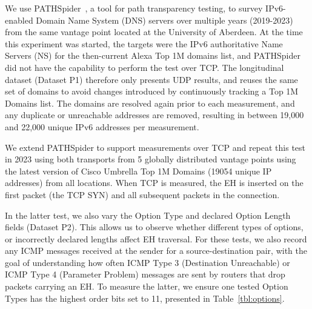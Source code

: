 \documentclass[conference]{IEEEtran}
\begin{document}
We use PATHSpider~\cite{learmonth2016pathspider}, a tool for path transparency testing, to survey IPv6-enabled Domain Name System (DNS) servers over multiple years (2019-2023) from the same vantage point located at the University of Aberdeen. At the time this experiment was started, the targets were the IPv6 authoritative Name Servers (NS) for the then-current Alexa Top 1M domains list, and PATHSpider did not have the capability to perform the test over TCP. The longitudinal dataset (Dataset P1) therefore only presents UDP results, and reuses the same set of domains to avoid changes introduced by continuously tracking a Top 1M Domains list. The domains are resolved again prior to each measurement, and any duplicate or unreachable addresses are removed, resulting in between 19,000 and 22,000 unique IPv6 addresses per measurement. 

We extend PATHSpider to support measurements over TCP and repeat this test in 2023 using both transports from 5 globally distributed vantage points using the latest version of Cisco Umbrella Top 1M Domains (19054 unique IP addresses) from all locations. When TCP is measured, the EH is inserted on the first packet (the TCP SYN) and all subsequent packets in the connection.

In the latter test, we also vary the Option Type and declared Option Length fields (Dataset P2). This allows us to observe whether different types of options, or incorrectly declared lengths affect EH traversal. For these tests, we also record any ICMP messages received at the sender for a source-destination pair, with the goal of understanding how often ICMP Type 3 (Destination Unreachable) or ICMP Type 4 (Parameter Problem) messages are sent by routers that drop packets carrying an EH. To measure the latter, we ensure one tested Option Types has the highest order bits set to 11, presented in Table~\ref{tbl:options}.
\end{document}
